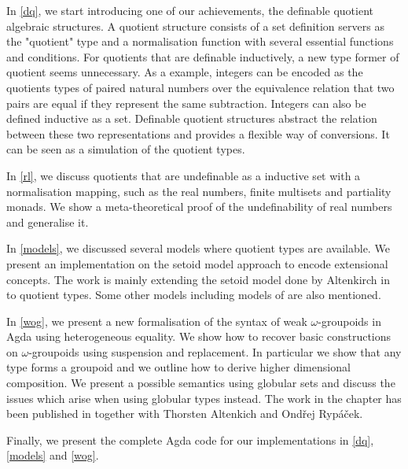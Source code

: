 In \autoref{dq}, we start introducing one of our achievements, the
definable quotient algebraic structures. A quotient structure consists of a set definition servers as the "quotient" type and a normalisation function with several essential functions and conditions.
For quotients that are definable inductively, a new type former of quotient seems unnecessary.
As a example, integers can be encoded as the
quotients types of paired natural numbers over the equivalence
relation that two pairs are equal if they represent the same
subtraction. Integers can also be defined inductive as a set. Definable quotient structures abstract the relation between these two representations and provides a flexible way of conversions. It can be seen as 
a simulation of the quotient types.


In \autoref{rl}, we discuss quotients that are undefinable as a inductive set with a normalisation mapping, such as the real numbers, finite multisets and partiality monads. We show a meta-theoretical proof of the undefinability of real numbers and generalise it.


In \autoref{models}, we discussed several models where quotient types are available. We present an implementation on the setoid model approach to encode
extensional concepts. The work is mainly extending the setoid model
done by Altenkirch in \cite{alti:lics99} to
quotient types. Some other models including models of \hott are also mentioned.


In \autoref{wog}, we present a new formalisation of the syntax of weak
  $\omega$-groupoids in Agda using heterogeneous equality. We show how
  to recover basic constructions on $\omega$-groupoids using
  suspension and replacement. In particular we show that any type
  forms a groupoid and we outline how to derive higher dimensional
  composition. We present a possible semantics using globular sets and
  discuss the issues which arise when using globular types instead. The work in the chapter has been published in \cite{LFMTP14} together with Thorsten Altenkich and Ond\v{r}ej Ryp\'{a}\v{c}ek.


Finally, we present the complete Agda code for our implementations in \autoref{dq}, \autoref{models} and \autoref{wog}.
